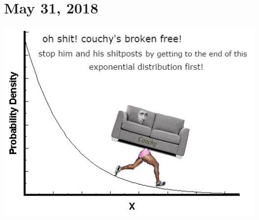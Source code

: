 \documentclass{article}
\begin{document}

\section{May 31, 2018}
\newpage

\includegraphics[scale=0.6]{couchy.jpg}
\end{document}
